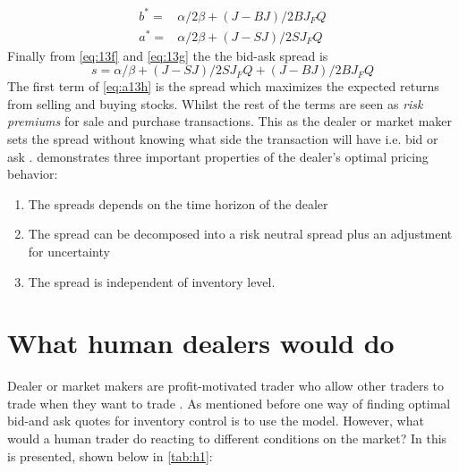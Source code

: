 \documentclass{kththesis}
\theoremstyle{definition}
\begin{document}
\begin{align}
\label{eq:a13f}
    b^{*} = & \alpha/2\beta + (J-BJ)/2BJ_{F}Q \\
    a^{*} = & \alpha/2\beta + (J-SJ)/2SJ_{F}Q \label{eq:a13g}
\end{align}
Finally from \autoref{eq:13f} and \autoref{eq:13g} the the bid-ask spread is
\begin{equation}
    \label{eq:a13h}
    s = \alpha / \beta + (J-SJ)/2SJ_{F}Q + (J-BJ)/2BJ_{F}Q
\end{equation}
The first term of \autoref{eq:a13h} is the spread which maximizes the expected returns from selling and buying stocks. Whilst the rest of the terms are seen as \textit{risk premiums} for sale and purchase transactions. This as the dealer or market maker sets the spread without knowing what side the transaction will have i.e. bid or ask \parencite{ho1981optimal}.
\newline
\newline
\textcite{ho1981optimal} demonstrates three important properties of the dealer's optimal pricing behavior:

\begin{enumerate}
    \item The spreads depends on the time horizon of the dealer
    \item The spread can be decomposed into a risk neutral spread plus an adjustment for uncertainty
    \item The spread is independent of inventory level.
\end{enumerate}

\section{What human dealers would do}
Dealer or market makers are profit-motivated trader who allow other traders to trade when they want to trade \parencite{harris2003trading}. As mentioned before one way of finding optimal bid-and ask quotes for inventory control is to use the \textcite{ho1981optimal} model. However, what would a human trader do reacting to different conditions on the market? In \textcite{harris2003trading} this is presented, shown below in \autoref{tab:h1}:
\end{document}
